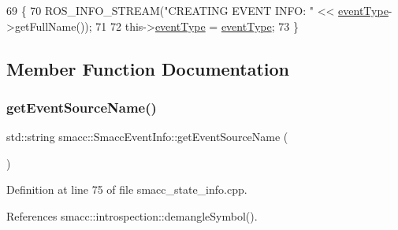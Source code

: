 \begin{DoxyCode}
69 \{
70     ROS\_INFO\_STREAM(\textcolor{stringliteral}{"CREATING EVENT INFO: "} << \hyperlink{structsmacc_1_1introspection_1_1SmaccEventInfo_af3bdf1abf797864e681662d92a5515f9}{eventType}->getFullName());
71 
72     this->\hyperlink{structsmacc_1_1introspection_1_1SmaccEventInfo_af3bdf1abf797864e681662d92a5515f9}{eventType} = \hyperlink{structsmacc_1_1introspection_1_1SmaccEventInfo_af3bdf1abf797864e681662d92a5515f9}{eventType};
73 \}
\end{DoxyCode}


\subsection{Member Function Documentation}
\mbox{\label{structsmacc_1_1introspection_1_1SmaccEventInfo_af9e90a557f8f62069a17234f79bcefa0}} 
\subsubsection{\texorpdfstring{get\+Event\+Source\+Name()}{getEventSourceName()}}
{\footnotesize\ttfamily std\+::string smacc\+::\+Smacc\+Event\+Info\+::get\+Event\+Source\+Name (\begin{DoxyParamCaption}{ }\end{DoxyParamCaption})}



Definition at line 75 of file smacc\+\_\+state\+\_\+info.\+cpp.



References smacc\+::introspection\+::demangle\+Symbol().


